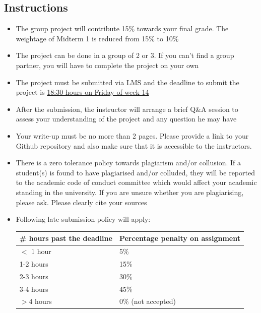 \documentclass[a4paper, 11pt]{article}
\begin{document}
\begin{center}
	\section*{Instructions}
	\begin{itemize}
		\item The group project will contribute 15\% towards your final grade. The weightage of Midterm 1 is reduced from 15\% to 10\%   
		\item The project can be done in a group of 2 or 3. If you can't find a group partner, you will have to complete the project on your own
		\item The project must be submitted via LMS and the deadline to submit the project is \underline{18:30 hours on Friday of week 14} 
		\item After the submission, the instructor will arrange a brief Q\&A session to assess your understanding of the project and any question he may have
		\item Your write-up must be no more than 2 pages. Please provide a link to your Github repository and also make sure that it is accessible to the instructors.
		\item There is a zero tolerance policy towards plagiarism and/or collusion. If a student(s) is found to have plagiarised and/or colluded, they will be reported to the academic code of conduct committee which would affect your academic standing in the university. If you are unsure whether you are plagiarising, please ask. Please clearly cite your sources
		\item Following late submission policy will apply:
		\begin{center}
	    	\begin{tabular}{ | l | l |}
			    \hline
			    \# hours past the deadline & Percentage penalty on assignment  \\ \hline
			    $<$ 1 hour & 5\% \\ \hline
			    1-2 hours & 15\% \\ \hline
			    2-3 hours & 30\% \\ \hline
			    3-4 hours & 45\% \\ \hline
			    $>$4  hours & 0\% (not accepted) \\ \hline
		    \end{tabular}
		\end{center}
	\end{itemize}
\end{center}

\newpage
\end{document}
